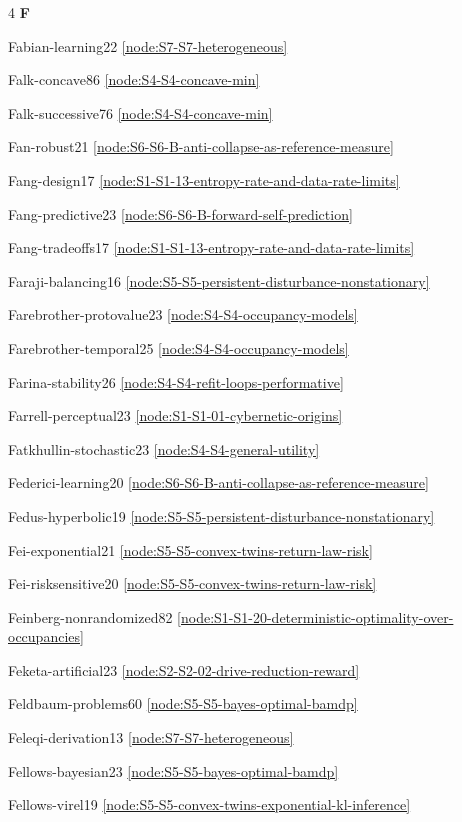 \documentclass[10pt]{article}
\begin{document}
{\begin{multicols}{4}
\smallskip\textbf{F}\par
Fabian-learning22 \hfill \ref{node:S7-S7-heterogeneous}\par
Falk-concave86 \hfill \ref{node:S4-S4-concave-min}\par
Falk-successive76 \hfill \ref{node:S4-S4-concave-min}\par
Fan-robust21 \hfill \ref{node:S6-S6-B-anti-collapse-as-reference-measure}\par
Fang-design17 \hfill \ref{node:S1-S1-13-entropy-rate-and-data-rate-limits}\par
Fang-predictive23 \hfill \ref{node:S6-S6-B-forward-self-prediction}\par
Fang-tradeoffs17 \hfill \ref{node:S1-S1-13-entropy-rate-and-data-rate-limits}\par
Faraji-balancing16 \hfill \ref{node:S5-S5-persistent-disturbance-nonstationary}\par
Farebrother-protovalue23 \hfill \ref{node:S4-S4-occupancy-models}\par
Farebrother-temporal25 \hfill \ref{node:S4-S4-occupancy-models}\par
Farina-stability26 \hfill \ref{node:S4-S4-refit-loops-performative}\par
Farrell-perceptual23 \hfill \ref{node:S1-S1-01-cybernetic-origins}\par
Fatkhullin-stochastic23 \hfill \ref{node:S4-S4-general-utility}\par
Federici-learning20 \hfill \ref{node:S6-S6-B-anti-collapse-as-reference-measure}\par
Fedus-hyperbolic19 \hfill \ref{node:S5-S5-persistent-disturbance-nonstationary}\par
Fei-exponential21 \hfill \ref{node:S5-S5-convex-twins-return-law-risk}\par
Fei-risksensitive20 \hfill \ref{node:S5-S5-convex-twins-return-law-risk}\par
Feinberg-nonrandomized82 \hfill \ref{node:S1-S1-20-deterministic-optimality-over-occupancies}\par
Feketa-artificial23 \hfill \ref{node:S2-S2-02-drive-reduction-reward}\par
Feldbaum-problems60 \hfill \ref{node:S5-S5-bayes-optimal-bamdp}\par
Feleqi-derivation13 \hfill \ref{node:S7-S7-heterogeneous}\par
Fellows-bayesian23 \hfill \ref{node:S5-S5-bayes-optimal-bamdp}\par
Fellows-virel19 \hfill \ref{node:S5-S5-convex-twins-exponential-kl-inference}\par

\end{multicols}}
\end{document}
